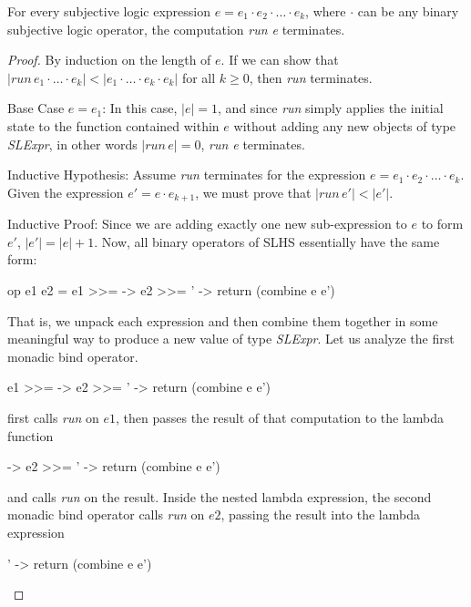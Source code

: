 \documentclass[thesis.tex]{subfiles}
\begin{document}
\begin{theorem}
  For every subjective logic expression $e = e_1 \cdot e_2 \cdot \dots \cdot e_k$, where $\cdot$
  can be any binary subjective logic operator, the computation \emph{run e} terminates.
\end{theorem}

\begin{proof}
  By induction on the length of $e$. If we can show that
  $|run\,e_1 \cdot \dots \cdot e_k| < |e_1 \cdot \dots \cdot e_k \cdot e_k|$ for all $k \geq 0$, then
  \emph{run} terminates.

  Base Case $e = e_1$: In this case, $|e| = 1$, and since \emph{run} simply applies the initial
  state to the function contained within $e$ without adding any new objects of type \emph{SLExpr},
  in other words $|run\,e| = 0$, \emph{run e} terminates.

  Inductive Hypothesis: Assume \emph{run} terminates for the expression $e = e_1 \cdot e_2 \cdot \dots \cdot e_k$.
  Given the expression $e' = e \cdot e_{k+1}$, we must prove that $|run\,e'| < |e'|$.

  Inductive Proof: Since we are adding exactly one new sub-expression to $e$ to form $e'$,
  $|e'| = |e| + 1$. Now, all binary operators of SLHS essentially have the same form:

  \begin{spec}
    op e1 e2 = e1 >>= \e -> e2 >>= \e' -> return (combine e e')
  \end{spec}

  That is, we unpack each expression and then combine them together in some meaningful way to produce
  a new value of type \emph{SLExpr}. Let us analyze the first monadic bind operator.

  \begin{spec}
    e1 >>= \e -> e2 >>= \e' -> return (combine e e')
  \end{spec}

  first calls \emph{run} on $e1$, then passes the result of that computation to the lambda function

  \begin{spec}
    \e -> e2 >>= \e' -> return (combine e e')
  \end{spec}

  and calls \emph{run} on the result. Inside the nested lambda expression, the second monadic bind operator
  calls \emph{run} on $e2$, passing the result into the lambda expression

  \begin{spec}
    \e' -> return (combine e e')
  \end{spec}


\end{proof}
\end{document}
